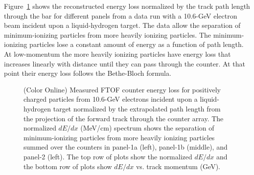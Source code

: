 \documentclass{elsart}
\begin{document}
Figure~\ref{ftof-dedx} shows the reconstructed energy loss normalized by the track path length through
the bar for different panels from a data run with a 10.6-GeV electron beam incident upon a liquid-hydrogen
target. The data allow the separation of minimum-ionizing particles from more heavily ionizing particles.
The minimum-ionizing particles lose a constant amount of energy as a function of path length. At low-momentum
the more heavily ionizing particles have energy loss that increases linearly with distance until they can pass
through the counter. At that point their energy loss follows the Bethe-Bloch formula.

\begin{figure}[htbp]
\vspace{5.0cm}
\caption{(Color Online) Measured FTOF counter energy loss for positively charged particles from
10.6-GeV electrons incident upon a liquid-hydrogen target normalized by the extrapolated path length
from the projection of the forward track through the counter array. The normalized $dE/dx$ (MeV/cm)
spectrum shows the separation of minimum-ionizing particles from more heavily ionizing particles summed
over the counters in panel-1a (left), panel-1b (middle), and panel-2 (left). The top row of plots show the
normalized $dE/dx$ and the bottom row of plots show $dE/dx$ vs. track momentum (GeV).}
\label{ftof-dedx}
\end{figure}
\end{document}
